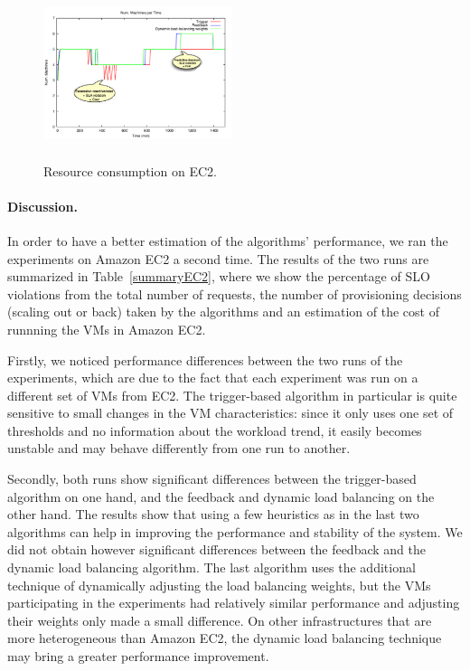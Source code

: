 \begin{figure}
\begin{center}
\includegraphics[width=0.49\textwidth, height=5cm]{./images/heterogeneous/explain_EC2_Provisioning}
\end{center}
\vspace{-5mm}
\caption{Resource consumption on EC2.}
\label{resEC2}
\end{figure}


\paragraph{Discussion.}
In order to have a better estimation of the algorithms' performance, we 
ran the experiments on Amazon EC2 a second time. The results of the two 
runs are summarized in Table~\ref{summaryEC2}, where we show the percentage
of SLO violations from the total number of requests, the number of
provisioning decisions (scaling out or back) taken by the algorithms
and an estimation of the cost of runnning the VMs in Amazon EC2.

Firstly, we noticed performance differences between the two runs of the
experiments, which are due to the fact that each experiment was run on
a different set of VMs from EC2. The trigger-based algorithm in particular
is quite sensitive to small changes in the VM characteristics: since it
only uses one set of thresholds and no information about the workload
trend, it easily becomes unstable and may behave differently from one
run to another.

Secondly, both runs show significant differences between the trigger-based
algorithm on one hand, and the feedback and dynamic load balancing on
the other hand. The results show that using a few heuristics as in the last
two algorithms can help in improving the performance and stability
of the system. We did not obtain however significant differences
between the feedback and the dynamic load balancing algorithm. The last
algorithm uses the additional technique of dynamically adjusting the
load balancing weights, but the VMs participating in the experiments 
had relatively similar performance and adjusting their weights only
made a small difference. On other infrastructures that are more heterogeneous
than Amazon EC2, the dynamic load balancing technique may bring
a greater performance improvement.  

